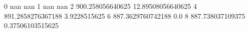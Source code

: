 0 nan nan
1 nan nan
2 900.258056640625 12.89508056640625
4 891.2858276367188 3.9228515625
6 887.3629760742188 0.0
8 887.738037109375 0.37506103515625
